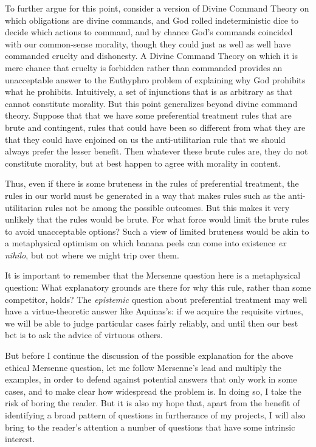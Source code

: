 To further argue for this point, consider a version of Divine Command Theory on which obligations are divine commands, and
God rolled indeterministic
dice to decide which actions to command, and by chance God's commands coincided with our common-sense morality, though they
could just as well as well have commanded cruelty and dishonesty. A Divine Command Theory on which it is mere chance
that cruelty is forbidden rather than commanded provides an unacceptable answer to the Euthyphro problem of explaining
why God prohibits what he prohibits.
Intuitively, a set of injunctions that is as arbitrary as that cannot constitute morality. But this point generalizes beyond
divine command theory. Suppose that that we have some preferential treatment rules that are brute and contingent, rules
that could have been so different from what they are that they could have enjoined on us the anti-utilitarian rule that we should always prefer the lesser benefit. Then whatever
these brute rules are, they do not constitute morality, but at best happen to agree with morality in content. 

Thus, even if there is some bruteness in the rules of preferential treatment, the rules in our world must be generated in a way
that makes rules such as the anti-utilitarian rules not be among the possible outcomes. But this makes it very unlikely that
the rules would be brute. For what force would limit the brute rules to avoid unacceptable options? Such a view of limited
bruteness would be akin to a metaphysical optimism on which banana peels can come into existence \textit{ex nihilo}, but not where we might trip
over them.

It is important to remember that the Mersenne question here is a metaphysical question: What explanatory grounds are there for why this
rule, rather than some competitor, holds? The \textit{epistemic} question about preferential treatment may well have a virtue-theoretic answer like Aquinas's: if
we acquire the requisite virtues, we will be able to judge particular cases fairly reliably, and until then our best bet is
to ask the advice of virtuous others.

But before I continue the discussion of the possible explanation for the above ethical Mersenne question, let me follow
Mersenne's lead and multiply the examples, in order to defend against potential answers that only work in some cases, and
to make clear how widespread the problem is. In doing so, I take the risk of boring the reader. But it is also my
hope that, apart from the benefit of identifying a broad pattern of questions in furtherance of my projects, I will 
also bring to the reader's attention a number of questions that have some intrinsic interest.

